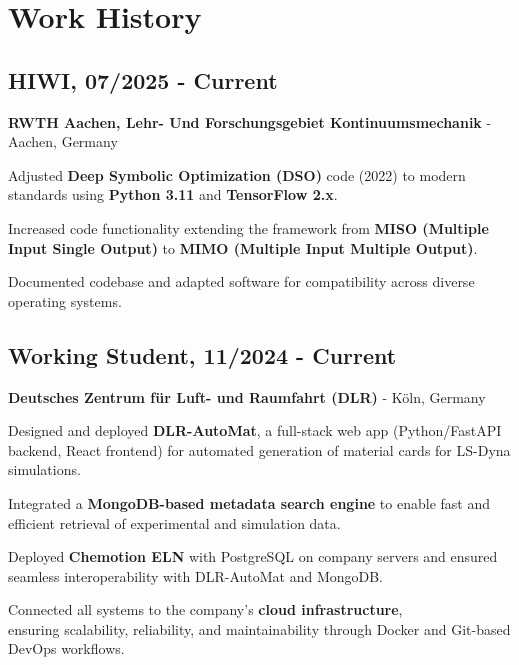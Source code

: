 \section{Work History}

\subsection*{HIWI, 07/2025 - Current}
\textbf{RWTH Aachen, Lehr- Und Forschungsgebiet Kontinuumsmechanik} - Aachen, Germany
\begin{highlights}
    \item Adjusted \textbf{Deep Symbolic Optimization (DSO)} code (2022) to modern standards using \textbf{Python 3.11} and \textbf{TensorFlow 2.x}.
    \item Increased code functionality extending the framework from \textbf{MISO (Multiple Input Single Output)} to \textbf{MIMO (Multiple Input Multiple Output)}.
    \item Documented codebase and adapted software for compatibility across diverse operating systems.
\end{highlights}

\subsection*{Working Student, 11/2024 - Current}
\textbf{Deutsches Zentrum für Luft- und Raumfahrt (DLR)} - Köln, Germany
\begin{highlights}
    \item Designed and deployed \textbf{DLR-AutoMat}, a full-stack web app (Python/FastAPI backend, React frontend) for automated generation of material cards for LS-Dyna simulations.
    \item Integrated a \textbf{MongoDB-based metadata search engine} to enable fast and efficient retrieval of experimental and simulation data.
    \item Deployed \textbf{Chemotion ELN} with PostgreSQL on company servers and ensured seamless interoperability with DLR-AutoMat and MongoDB.
    \item Connected all systems to the company's \textbf{cloud infrastructure}, \\
ensuring scalability, reliability, and maintainability through Docker and Git-based DevOps workflows.
\end{highlights}

